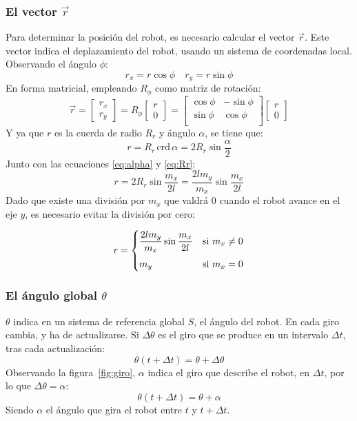 \documentclass[10pt,a4paper,hidelinks,twocolumn,nobalancelastpage]{article}
\begin{document}
\subsubsection{El vector $\vec{r}$}
Para determinar la posición del robot, es necesario calcular el vector 
$\vec{r}$. Este vector indica el deplazamiento del robot, usando un sistema de 
coordenadas local. Observando el ángulo $\phi$:
$$r_x = r \cos \phi \quad
r_y = r \sin \phi $$
En forma matricial, empleando $R_\phi$ como matriz de rotación:
\begin{equation}
\vec{r} =
\begin{bmatrix}
r_x\\
r_y
\end{bmatrix}
=
R_\phi
\begin{bmatrix}
r\\
0
\end{bmatrix}
=
\begin{bmatrix}
\cos \phi & -\sin \phi \\
\sin \phi & \cos \phi \\
\end{bmatrix}
\begin{bmatrix}
r\\
0
\end{bmatrix}
\label{eq:r_matrix}
\end{equation}
Y ya que $r$ es la cuerda de radio $R_r$ y ángulo $\alpha$, se tiene que:
$$ r = R_r \, \text{crd} \, \alpha = 2 R_r \sin \frac{\alpha}{2} $$
Junto con las ecuaciones \ref{eq:alpha} y \ref{eq:Rr}:
$$ r = 2 R_r \sin \frac{m_x}{2l} =
	\frac{2 l m_y}{m_x} \sin \frac{m_x}{2l}$$
Dado que existe una división por $m_x$ que valdrá 0 cuando el robot avance en 
el eje $y$, es necesario evitar la división por cero:

\begin{equation}
r = \begin{dcases}
		\frac{2 l m_y}{m_x} \sin \frac{m_x}{2l} & \text{si } m_x \ne 0 \\[1mm]
		m_y & \text{si } m_x = 0 \\
	\end{dcases}
\label{eq:r}
\end{equation}
\subsubsection{El ángulo global $\theta$}
$\theta$ indica en un sistema de referencia global $S$, el ángulo del robot. En 
cada giro cambia, y ha de actualizarse. Si $\Delta \theta$ es el giro que se 
produce en un intervalo $\Delta t$, tras cada actualización:
	$$ \theta(t + \Delta t) = \theta + \Delta \theta $$
Observando la figura~\ref{fig:giro}, $\alpha$ indica el giro que describe el 
robot, en $\Delta t$, por lo que $\Delta \theta = \alpha$:
\begin{equation}
	\theta(t + \Delta t) = \theta + \alpha
\end{equation}
Siendo $\alpha$ el ángulo que gira el robot entre $t$ y $t + \Delta t$.
\end{document}
